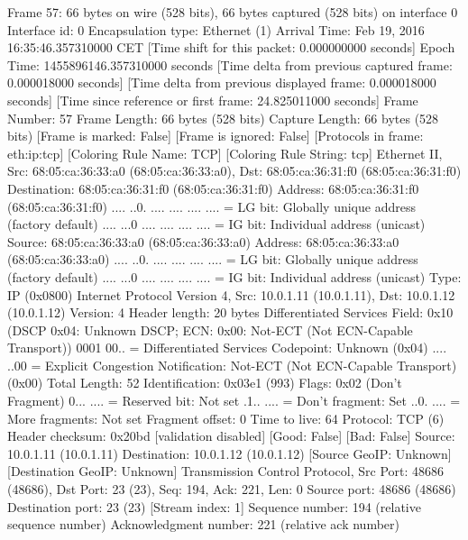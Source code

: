 Frame 57: 66 bytes on wire (528 bits), 66 bytes captured (528 bits) on interface 0
    Interface id: 0
    Encapsulation type: Ethernet (1)
    Arrival Time: Feb 19, 2016 16:35:46.357310000 CET
    [Time shift for this packet: 0.000000000 seconds]
    Epoch Time: 1455896146.357310000 seconds
    [Time delta from previous captured frame: 0.000018000 seconds]
    [Time delta from previous displayed frame: 0.000018000 seconds]
    [Time since reference or first frame: 24.825011000 seconds]
    Frame Number: 57
    Frame Length: 66 bytes (528 bits)
    Capture Length: 66 bytes (528 bits)
    [Frame is marked: False]
    [Frame is ignored: False]
    [Protocols in frame: eth:ip:tcp]
    [Coloring Rule Name: TCP]
    [Coloring Rule String: tcp]
Ethernet II, Src: 68:05:ca:36:33:a0 (68:05:ca:36:33:a0), Dst: 68:05:ca:36:31:f0 (68:05:ca:36:31:f0)
    Destination: 68:05:ca:36:31:f0 (68:05:ca:36:31:f0)
        Address: 68:05:ca:36:31:f0 (68:05:ca:36:31:f0)
        .... ..0. .... .... .... .... = LG bit: Globally unique address (factory default)
        .... ...0 .... .... .... .... = IG bit: Individual address (unicast)
    Source: 68:05:ca:36:33:a0 (68:05:ca:36:33:a0)
        Address: 68:05:ca:36:33:a0 (68:05:ca:36:33:a0)
        .... ..0. .... .... .... .... = LG bit: Globally unique address (factory default)
        .... ...0 .... .... .... .... = IG bit: Individual address (unicast)
    Type: IP (0x0800)
Internet Protocol Version 4, Src: 10.0.1.11 (10.0.1.11), Dst: 10.0.1.12 (10.0.1.12)
    Version: 4
    Header length: 20 bytes
    Differentiated Services Field: 0x10 (DSCP 0x04: Unknown DSCP; ECN: 0x00: Not-ECT (Not ECN-Capable Transport))
        0001 00.. = Differentiated Services Codepoint: Unknown (0x04)
        .... ..00 = Explicit Congestion Notification: Not-ECT (Not ECN-Capable Transport) (0x00)
    Total Length: 52
    Identification: 0x03e1 (993)
    Flags: 0x02 (Don't Fragment)
        0... .... = Reserved bit: Not set
        .1.. .... = Don't fragment: Set
        ..0. .... = More fragments: Not set
    Fragment offset: 0
    Time to live: 64
    Protocol: TCP (6)
    Header checksum: 0x20bd [validation disabled]
        [Good: False]
        [Bad: False]
    Source: 10.0.1.11 (10.0.1.11)
    Destination: 10.0.1.12 (10.0.1.12)
    [Source GeoIP: Unknown]
    [Destination GeoIP: Unknown]
Transmission Control Protocol, Src Port: 48686 (48686), Dst Port: 23 (23), Seq: 194, Ack: 221, Len: 0
    Source port: 48686 (48686)
    Destination port: 23 (23)
    [Stream index: 1]
    Sequence number: 194    (relative sequence number)
    Acknowledgment number: 221    (relative ack number)
